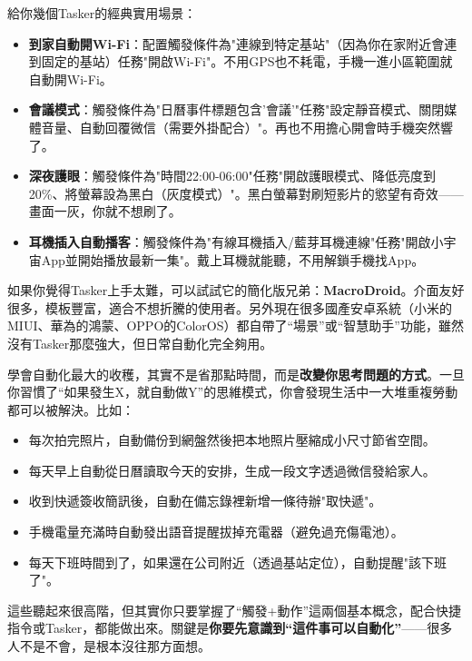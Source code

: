 給你幾個Tasker的經典實用場景：

\begin{itemize}
  \item \textbf{到家自動開Wi-Fi}：配置觸發條件為"連線到特定基站"（因為你在家附近會連到固定的基站）任務"開啟Wi-Fi"。不用GPS也不耗電，手機一進小區範圍就自動開Wi-Fi。
  \item \textbf{會議模式}：觸發條件為"日曆事件標題包含'會議'"任務"設定靜音模式、關閉媒體音量、自動回覆微信（需要外掛配合）"。再也不用擔心開會時手機突然響了。
  \item \textbf{深夜護眼}：觸發條件為"時間22:00-06:00"任務"開啟護眼模式、降低亮度到20\%、將螢幕設為黑白（灰度模式）"。黑白螢幕對刷短影片的慾望有奇效——畫面一灰，你就不想刷了。
  \item \textbf{耳機插入自動播客}：觸發條件為"有線耳機插入/藍芽耳機連線"任務"開啟小宇宙App並開始播放最新一集"。戴上耳機就能聽，不用解鎖手機找App。
\end{itemize}

如果你覺得Tasker上手太難，可以試試它的簡化版兄弟：\textbf{MacroDroid}。介面友好很多，模板豐富，適合不想折騰的使用者。另外現在很多國產安卓系統（小米的MIUI、華為的鴻蒙、OPPO的ColorOS）都自帶了“場景”或“智慧助手”功能，雖然沒有Tasker那麼強大，但日常自動化完全夠用。


學會自動化最大的收穫，其實不是省那點時間，而是\textbf{改變你思考問題的方式}。一旦你習慣了“如果發生X，就自動做Y”的思維模式，你會發現生活中一大堆重複勞動都可以被解決。比如：

\begin{itemize}
  \item 每次拍完照片，自動備份到網盤然後把本地照片壓縮成小尺寸節省空間。
  \item 每天早上自動從日曆讀取今天的安排，生成一段文字透過微信發給家人。
  \item 收到快遞簽收簡訊後，自動在備忘錄裡新增一條待辦"取快遞"。
  \item 手機電量充滿時自動發出語音提醒拔掉充電器（避免過充傷電池）。
  \item 每天下班時間到了，如果還在公司附近（透過基站定位），自動提醒"該下班了"。
\end{itemize}

這些聽起來很高階，但其實你只要掌握了“觸發+動作”這兩個基本概念，配合快捷指令或Tasker，都能做出來。關鍵是\textbf{你要先意識到“這件事可以自動化”}——很多人不是不會，是根本沒往那方面想。


